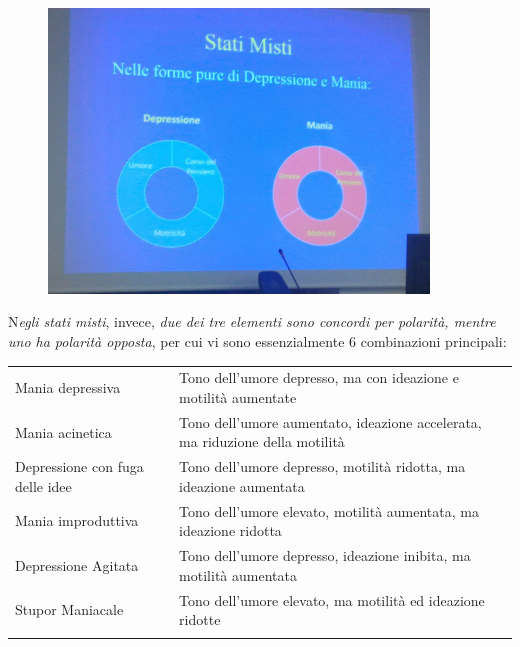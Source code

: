 \begin{itemize}
\begin{figure}[!ht]
\centering
	\includegraphics[width=0.9\textwidth]{02/image10.jpeg}
\end{figure}

N\emph{egli stati misti}, invece, \emph{due dei tre elementi sono
concordi per polarità, mentre uno ha polarità opposta}, per cui vi sono
essenzialmente 6 combinazioni principali:


\begin{table}
\begin{tabular}{p{}p{}}

Mania depressiva		&	Tono dell’umore depresso, ma con ideazione e motilità aumentate \\
Mania acinetica		&	Tono dell’umore aumentato, ideazione accelerata, ma riduzione della motilità  \\
Depressione con fuga delle idee	&	Tono dell’umore depresso, motilità ridotta, ma ideazione aumentata \\
Mania improduttiva	&	Tono dell’umore elevato, motilità aumentata, ma ideazione ridotta \\
Depressione Agitata	&	Tono dell’umore depresso, ideazione inibita, ma motilità aumentata \\
Stupor Maniacale		&	Tono dell’umore elevato,  ma motilità ed ideazione ridotte \\

\noalign{\smallskip}\hline\noalign{\smallskip}
\end{tabular}
\end{table}



\end{itemize}
